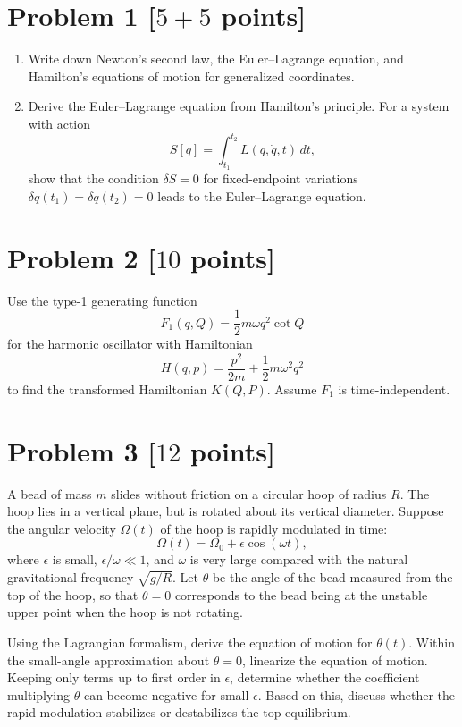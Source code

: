 \documentclass[11pt, a4paper]{article} %
\begin{document}
\section*{Problem 1 [$5 + 5$ points]}
\begin{enumerate}
  \item[(1)] Write down Newton's second law, the Euler--Lagrange equation, and Hamilton's equations of motion for generalized coordinates.

  \item[(2)] Derive the Euler--Lagrange equation from Hamilton's principle. For a system with action
  \[
  S[q]=\int_{t_1}^{t_2} L(q,\dot{q},t)\,dt,
  \]
  show that the condition \(\delta S=0\) for fixed-endpoint variations \(\delta q(t_1)=\delta q(t_2)=0\) leads to the Euler--Lagrange equation.
\end{enumerate}

\newpage

\section*{Problem 2 [$10$ points]}
Use the type-1 generating function
\[
F_1(q,Q)=\frac{1}{2}m\omega q^2\cot Q
\]
for the harmonic oscillator with Hamiltonian
\[
H(q,p)=\frac{p^2}{2m}+\frac{1}{2}m\omega^2q^2
\]
to find the transformed Hamiltonian \(K(Q,P)\). Assume \(F_1\) is time-independent.

\newpage

\section*{Problem 3 [$12$ points]}
A bead of mass \(m\) slides without friction on a circular hoop of radius \(R\). The hoop lies in a vertical plane, but is rotated about its vertical diameter. Suppose the angular velocity \(\Omega(t)\) of the hoop is rapidly modulated in time:
\[
\Omega(t)=\Omega_0+\epsilon \cos(\omega t),
\]
where \(\epsilon\) is small, \(\epsilon/\omega\ll 1\), and \(\omega\) is very large compared with the natural gravitational frequency \(\sqrt{g/R}\). Let \(\theta\) be the angle of the bead measured from the top of the hoop, so that \(\theta=0\) corresponds to the bead being at the unstable upper point when the hoop is not rotating.

Using the Lagrangian formalism, derive the equation of motion for \(\theta(t)\). Within the small-angle approximation about \(\theta=0\), linearize the equation of motion. Keeping only terms up to first order in \(\epsilon\), determine whether the coefficient multiplying \(\theta\) can become negative for small \(\epsilon\). Based on this, discuss whether the rapid modulation stabilizes or destabilizes the top equilibrium.
\end{document}
